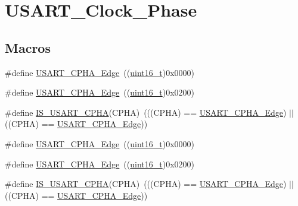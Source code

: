 \hypertarget{group___u_s_a_r_t___clock___phase}{}\section{U\+S\+A\+R\+T\+\_\+\+Clock\+\_\+\+Phase}
\label{group___u_s_a_r_t___clock___phase}
\subsection*{Macros}
\begin{DoxyCompactItemize}
\item 
\#define \hyperlink{group___u_s_a_r_t___clock___phase_gab6c0fb052fb9bc418cf368c1a0e4643b}{U\+S\+A\+R\+T\+\_\+\+C\+P\+H\+A\+\_\+Edge}~((\hyperlink{_p_e___types_8h_a1f1825b69244eb3ad2c7165ddc99c956}{uint16\+\_\+t})0x0000)
\item 
\#define \hyperlink{group___u_s_a_r_t___clock___phase_ga66344d0725f1300e9d0f8f1708111f25}{U\+S\+A\+R\+T\+\_\+\+C\+P\+H\+A\+\_\+Edge}~((\hyperlink{_p_e___types_8h_a1f1825b69244eb3ad2c7165ddc99c956}{uint16\+\_\+t})0x0200)
\item 
\#define \hyperlink{group___u_s_a_r_t___clock___phase_ga66fa1a3a757025fcd8dd069a90689f88}{I\+S\+\_\+\+U\+S\+A\+R\+T\+\_\+\+C\+P\+HA}(C\+P\+HA)~(((C\+P\+HA) == \hyperlink{openmotestm_2library_2inc_2stm32f10x__usart_8h_ab6c0fb052fb9bc418cf368c1a0e4643b}{U\+S\+A\+R\+T\+\_\+\+C\+P\+H\+A\+\_\+Edge}) $\vert$$\vert$ ((C\+P\+HA) == \hyperlink{openmotestm_2library_2inc_2stm32f10x__usart_8h_a66344d0725f1300e9d0f8f1708111f25}{U\+S\+A\+R\+T\+\_\+\+C\+P\+H\+A\+\_\+Edge}))
\item 
\#define \hyperlink{group___u_s_a_r_t___clock___phase_gab6c0fb052fb9bc418cf368c1a0e4643b}{U\+S\+A\+R\+T\+\_\+\+C\+P\+H\+A\+\_\+Edge}~((\hyperlink{_p_e___types_8h_a1f1825b69244eb3ad2c7165ddc99c956}{uint16\+\_\+t})0x0000)
\item 
\#define \hyperlink{group___u_s_a_r_t___clock___phase_ga66344d0725f1300e9d0f8f1708111f25}{U\+S\+A\+R\+T\+\_\+\+C\+P\+H\+A\+\_\+Edge}~((\hyperlink{_p_e___types_8h_a1f1825b69244eb3ad2c7165ddc99c956}{uint16\+\_\+t})0x0200)
\item 
\#define \hyperlink{group___u_s_a_r_t___clock___phase_ga66fa1a3a757025fcd8dd069a90689f88}{I\+S\+\_\+\+U\+S\+A\+R\+T\+\_\+\+C\+P\+HA}(C\+P\+HA)~(((C\+P\+HA) == \hyperlink{openmotestm_2library_2inc_2stm32f10x__usart_8h_ab6c0fb052fb9bc418cf368c1a0e4643b}{U\+S\+A\+R\+T\+\_\+\+C\+P\+H\+A\+\_\+Edge}) $\vert$$\vert$ ((C\+P\+HA) == \hyperlink{openmotestm_2library_2inc_2stm32f10x__usart_8h_a66344d0725f1300e9d0f8f1708111f25}{U\+S\+A\+R\+T\+\_\+\+C\+P\+H\+A\+\_\+Edge}))
\end{DoxyCompactItemize}


